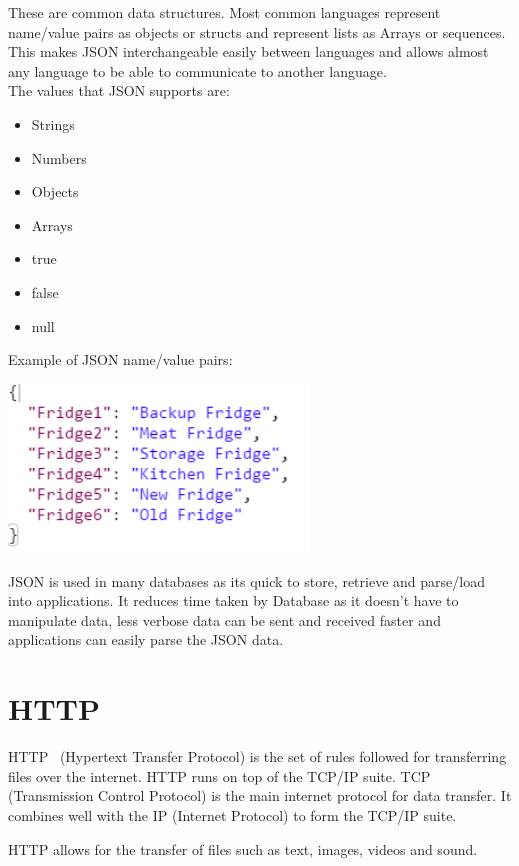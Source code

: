 These are common data structures. Most common languages represent name/value pairs as objects or structs and represent lists as Arrays or sequences. This makes JSON interchangeable easily between languages and allows almost any language to be able to communicate to another language. \\

The values that JSON supports are:
\begin{itemize}
\item Strings
\item Numbers
\item Objects
\item Arrays
\item true
\item false
\item null
\end{itemize}	

Example of JSON name/value pairs:
\begin{center}    
    \includegraphics[width=80mm]{img/json.png}
\end{center}

JSON is used in many databases as its quick to store, retrieve and parse/load into applications. It reduces time taken by Database as it doesn't have to manipulate data, less verbose data can be sent and received faster and applications can easily parse the JSON data.

\section{HTTP}
HTTP~\cite{HTTP} (Hypertext Transfer Protocol) is the set of rules followed for transferring files over the internet. HTTP runs on top of the TCP/IP suite. TCP (Transmission Control Protocol) is the main internet protocol for data transfer. It combines well with the IP (Internet Protocol) to form the TCP/IP suite.

HTTP allows for the transfer of files such as text, images, videos and sound. \\

